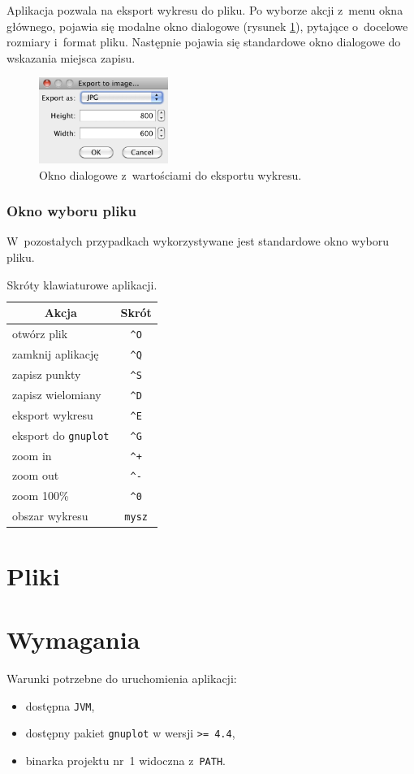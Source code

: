 \documentclass[10pt,a4paper]{article}
\newcommand{\prog}[1]{\texttt{#1}}
\begin{document}
Aplikacja pozwala na eksport wykresu do pliku. Po wyborze akcji z~menu okna
głównego, pojawia się modalne okno dialogowe (rysunek
\ref{fig:eksport-wykresu}), pytające o~docelowe rozmiary i~format pliku.
Następnie pojawia się standardowe okno dialogowe do wskazania miejsca zapisu.

\begin{figure}[h]
  \centering
  \includegraphics[width=0.374\textwidth]{images/eksport-wykresu}
  \caption{Okno dialogowe z~wartościami do eksportu wykresu.}
  \label{fig:eksport-wykresu}
\end{figure}

\subsubsection{Okno wyboru pliku}

W~pozostałych przypadkach wykorzystywane jest standardowe okno wyboru pliku.

\begin{table}[p]
  \centering
  \begin{tabular}{l c}
    \toprule
    \multicolumn{1}{c}{\bf Akcja} & {\bf Skrót} \\
    \midrule
    otwórz plik              &  \verb|^O|  \\
    zamknij aplikację        &  \verb|^Q|  \\
    zapisz punkty            &  \verb|^S|  \\
    zapisz wielomiany        &  \verb|^D|  \\
    eksport wykresu          &  \verb|^E|  \\
    eksport do {\tt gnuplot} &  \verb|^G|  \\
    \midrule
    zoom in                  &  \verb|^+|  \\
    zoom out                 &  \verb|^-|  \\
    zoom 100\%               &  \verb|^0|  \\
    obszar wykresu           &  \verb|mysz|  \\
    \bottomrule
  \end{tabular}
  \caption{Skróty klawiaturowe aplikacji.}
  \label{tab:skroty}
\end{table}

\section{Pliki}
\label{sec:pliki}

\section{Wymagania}
\label{sec:wymagania}

Warunki potrzebne do uruchomienia aplikacji:
\begin{itemize}
  \item dostępna \prog{JVM},
  \item dostępny pakiet \prog{gnuplot} w wersji \prog{>= 4.4},
  \item binarka projektu nr~1 widoczna z~\prog{PATH}.
\end{itemize}
\end{document}

